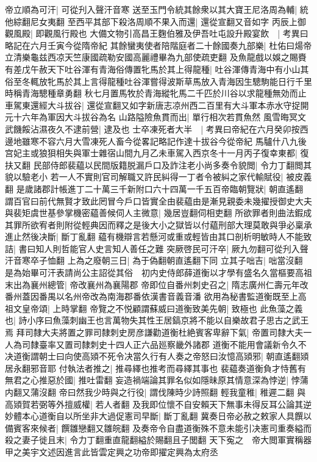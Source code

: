 帝立順為可汗|{
	可從刋入聲汗音寒}
送至玉門令統其餘衆以其大寶王尼洛周為輔|{
	統他綜翻尼女夷翻}
至西平其部下殺洛周順不果入而還|{
	還從宣翻又音如字}
丙辰上御觀風殿|{
	即觀風行殿也}
大備文物引高昌王麴伯雅及伊吾吐屯設升殿宴飲　|{
	考異曰略記在六月壬寅今從隋帝紀}
其餘蠻夷使者陪階庭者二十餘國奏九部樂|{
	杜佑曰煬帝立清樂龜兹西凉天竺康國疏勒安國高麗禮畢為九部使疏吏翻}
及魚龍戲以娛之賜賚有差戊午赦天下吐谷渾有青海俗傳置牝馬於其上得龍種|{
	吐谷渾傳青海中有小山其俗至冬輒放牝馬於其上言得龍種吐谷渾嘗得波斯草馬放入青海因生驄駒能日行千里時稱青海驄種章勇翻}
秋七月置馬牧於青海縱牝馬二千匹於川谷以求龍種無効而止車駕東還經大斗拔谷|{
	還從宣翻又如字新唐志凉州西二百里有大斗軍本赤水守捉開元十六年為軍因大斗拔谷為名}
山路隘險魚貫而出|{
	單行相次若貫魚然}
風雪晦冥文武饑餒沾濕夜久不逮前營|{
	逮及也}
士卒凍死者大半　|{
	考異曰帝紀在六月癸卯按西邊地雖寒不容六月大雪凍死人畜今從畧記略記作達十拔谷今從帝紀}
馬驢什八九後宫妃主或狼狽相失與軍士雜宿山間九月乙未車駕入西京冬十一月丙子復幸東都|{
	復扶又翻}
民部侍郎裴藴以民間版籍脱漏戶口及詐注老小尚多奏令貌閲|{
	令力丁翻閲其貌以驗老小}
若一人不實則官司解職又許民糾得一丁者令被糾之家代輸賦役|{
	被皮義翻}
是歲諸郡計帳進丁二十萬三千新附口六十四萬一千五百帝臨朝覽狀|{
	朝直遙翻}
謂百官曰前代無賢才致此罔冒今戶口皆實全由裴藴由是漸見親委未幾擢授御史大夫與裴矩虞世基參掌機密藴善候伺人主微意|{
	幾居豈翻伺相吏翻}
所欲罪者則曲法鍜成其罪所欲宥者則附從輕典因而釋之是後大小之獄皆以付藴刑部大理莫敢與爭必稟承進止然後决斷|{
	斷丁亂翻}
藴有機辯言若懸河或重或輕皆由其口剖析明敏時人不能致詰|{
	書曰知人則哲能官人史言知人善任之難}
突厥啓民可汗卒|{
	厥九勿翻可從刋入聲汗音寒卒子恤翻}
上為之廢朝三日|{
	為于偽翻朝直遙翻下同}
立其子咄吉|{
	咄當沒翻}
是為始畢可汗表請尚公主詔從其俗　初内史侍郎薛道衡以才學有盛名久當樞要高祖末出為襄州總管|{
	帝改襄州為襄陽郡}
帝即位自番州刺史召之|{
	隋志廣州仁壽元年改番州蓋因番禺以名州帝改為南海郡番依漢書音義音潘}
欲用為秘書監道衡既至上高祖文皇帝頌|{
	上時掌翻}
帝覽之不悦顧謂蘇威曰道衡致美先朝|{
	致極也}
此魚藻之義也|{
	詩小序曰魚藻刺幽王也言萬物失其性王居鎬京將不能以自樂故君子思古之武王焉}
拜司隸大夫將置之罪司隸刺史房彦謙勸道衡杜絶賓客卑辭下氣|{
	帝置司隸大夫一人為司隸臺率又置司隸刺史十四人正六品廵察畿外諸郡}
道衡不能用會議新令久不决道衡謂朝士曰向使高熲不死令决當久行有人奏之帝怒曰汝憶高熲邪|{
	朝直遙翻熲居永翻邪音耶}
付執法者推之|{
	推尋繹也推考而尋繹其事也}
裴藴奏道衡負才恃舊有無君之心推惡於國|{
	推吐雷翻}
妄造禍端論其罪名似如隱昧原其情意深為悖逆|{
	悖蒲内翻又蒲沒翻}
帝曰然我少時與之行役|{
	謂伐陳時少詩照翻}
輕我童稚|{
	稚遲二翻}
與高熲賀若弼等外擅威權|{
	若人者翻}
及我即位懷不自安賴天下無事未得反耳公論其逆妙體本心道衡自以所坐非大過促憲司早斷|{
	斷丁亂翻}
冀奏日帝必赦之敕家人具饌以備賓客來候者|{
	饌雛戀翻又雛皖翻}
及奏帝令自盡道衡殊不意未能引决憲司重奏縊而殺之妻子徙且末|{
	令力丁翻重直龍翻縊於賜翻且子閭翻}
天下寃之　帝大閲軍實稱器甲之美宇文述因進言此皆雲定興之功帝即擢定興為太府丞

